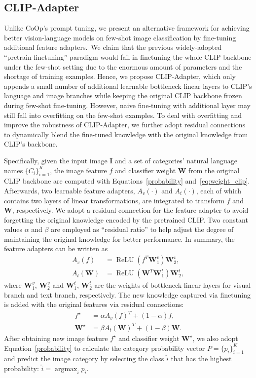\documentclass[default,iicol]{sn-jnl}%
\theoremstyle{thmstyleone}%
\theoremstyle{thmstyletwo}%
\theoremstyle{thmstylethree}%
\begin{document}
\subsection{CLIP-Adapter}
\label{sec:clip-adapter}
Unlike CoOp's prompt tuning, we present an alternative framework for achieving better vision-language models on few-shot image classification by fine-tuning additional feature adapters.~We claim that the previous widely-adopted ``pretrain-finetuning'' paradigm would fail in finetuning the whole CLIP backbone under the few-shot setting due to the enormous amount of parameters and the shortage of training examples. Hence, we propose CLIP-Adapter, which only appends a small number of additional learnable bottleneck linear layers to CLIP's language and image branches while keeping the original CLIP backbone frozen during few-shot fine-tuning. However, naive fine-tuning with additional layer may still fall into overfitting on the few-shot examples. To deal with overfitting and improve the robustness of CLIP-Adapter, we further adopt residual connections to dynamically blend the fine-tuned knowledge with the original knowledge from CLIP's backbone. 

Specifically, given the input image $\mathbf{I}$ and a set of categories' natural language names $\{C_i\}^{K}_{i=1}$, the image feature $f$ and classifier weight $\mathbf{W}$ from the original CLIP backbone are computed with Equations~\eqref{probability} and~\eqref{eq:weight_clip}. 
Afterwards, two learnable feature adapters, $A_v(\cdot)$ and $A_t(\cdot)$, each of which contains two layers of linear transformations, are integrated to transform $f$ and $\mathbf{W}$, respectively. 
We adopt a residual connection for the feature adapter to avoid forgetting the original knowledge encoded by the pretrained CLIP. Two constant values $\alpha$ and $\beta$ are employed as ``residual ratio'' to help adjust the degree of maintaining the original knowledge for better performance. In summary, the feature adapters can be written as
\begin{align}
        A_v(f) &= \operatorname{ReLU}(f^{T} \mathbf{W}_1^v) \mathbf{W}_2^v, \\
        A_t(\mathbf{W}) &= \operatorname{ReLU}(\mathbf{W}^{T} \mathbf{W}_1^t) \mathbf{W}_2^t,
\end{align}
where $\mathbf{W}_1^v$, $\mathbf{W}_2^v$ and $\mathbf{W}_1^t$, $\mathbf{W}_2^t$ are the weights of bottleneck linear layers for visual branch and text branch, respectively.
The new knowledge captured via finetuning is added with the original features via residual connections:
\begin{align}
        f^{\star} &= \alpha A_{v}(f)^{T} + (1-\alpha) f, \\
        \mathbf{W}^{\star} &= \beta A_{t}(\mathbf{W})^{T} + (1 - \beta) \mathbf{W}.
\end{align}
After obtaining new image feature $f^{\star}$ and classifier weight $\mathbf{W}^{\star}$, we also adopt Equation~\eqref{probability} to calculate the category probability vector $P = \{p_i\}^{K}_{i=1}$ and predict the image category by selecting the class $\hat{i}$ that has the highest probability: $\hat{i} = \mathop{\arg\max}_{i} p_{i}$.
\end{document}

